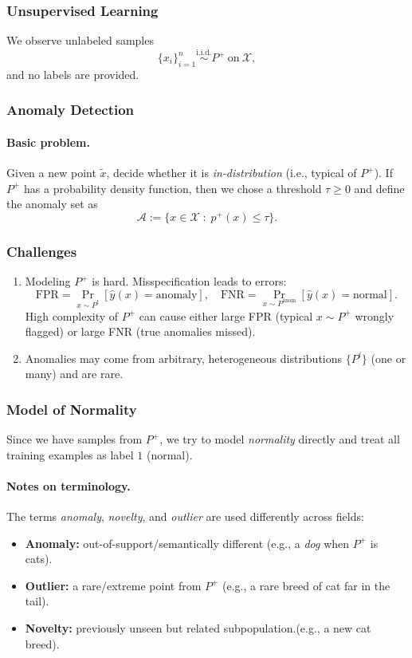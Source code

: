 \documentclass[11pt]{article}
\theoremstyle{plain}
\begin{document}
\subsubsection{Unsupervised Learning}
We observe unlabeled samples
\[
  \{x_i\}_{i=1}^n \stackrel{\text{i.i.d.}}{\sim} P^{+}\ \text{on}\ \mathcal X,
\]
and no labels are provided.

\subsubsection{Anomaly Detection}
\paragraph{Basic problem.}
Given a new point $\tilde x$, decide whether it is \emph{in-distribution} (i.e., typical of $P^{+}$).
If $P^{+}$ has a probability density function, then we chose a threshold $\tau\ge 0$ and define the anomaly set as
\[
  \mathcal A := \{x\in\mathcal X \;:\; p^{+}(x)\le \tau\}.
\]

\subsubsection{Challenges}
\begin{enumerate}
  \item Modeling $P^{+}$ is hard. Misspecification leads to errors:
  \[
    \text{FPR}=\Pr_{x\sim P^{t}}[\hat y(x)=\text{anomaly}],\quad
    \text{FNR}=\Pr_{x\sim P^{\text{anom}}}[\hat y(x)=\text{normal}].
  \]
  High complexity of $P^{+}$ can cause either large FPR (typical $x\sim P^{+}$ wrongly flagged) or large FNR (true anomalies missed).
  \item Anomalies may come from arbitrary, heterogeneous distributions $\{P^{i}\}$ (one or many) and are rare.
\end{enumerate}

\subsubsection{Model of Normality}
Since we have samples from $P^{
+
}$, we try to model \emph{normality} directly and treat all training examples as label $1$ (normal).
\paragraph{Notes on terminology.}
The terms \emph{anomaly}, \emph{novelty}, and \emph{outlier} are used differently across fields:
\begin{itemize}
  \item \textbf{Anomaly:} out-of-support/semantically different (e.g., a \emph{dog} when $P^{+}$ is cats).
  \item \textbf{Outlier:} a rare/extreme point from $P^{+}$ (e.g., a rare breed of cat far in the tail).
  \item \textbf{Novelty:} previously unseen but related subpopulation.(e.g., a new cat breed).
\end{itemize}
\end{document}
